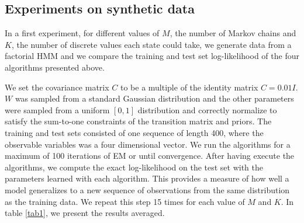\documentclass{article}
\begin{document}
\subsection{Experiments on synthetic data}

In a first experiment, for different values of $M$, the number of Markov chains and $K$, the number of discrete values each state could take, we generate data from a factorial HMM and we compare the training and test set log-likelihood of the four algorithms presented above.

We set the covariance matrix $C$ to be a multiple of the identity matrix $C = 0.01 I$. $W$ was sampled from a standard Gaussian distribution and the other parameters were sampled from a uniform $[0,1]$ distribution and correctly normalize to satisfy the sum-to-one constraints of the transition matrix and priors. The training and test sets consisted of one sequence of length 400, where the observable variables was a four dimensional vector. We run the algorithms for a maximum of 100 iterations of EM or until convergence. After having execute the algorithms, we compute the exact log-likelihood on the test set with the parameters learned with each algorithm. This provides a measure of how well a model generalizes to a new sequence of observations from the same distribution as the training data. We repeat this step 15 times for each value of $M$ and $K$. In table \ref{tab1}, we present the results averaged.
\end{document}
